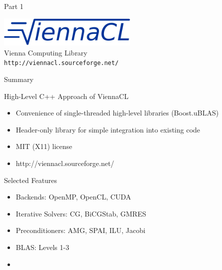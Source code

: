 



\begin{frame}{Part 1}
 \begin{center}
   \large \includegraphics[width=0.5\textwidth]{figures/viennacl-logo} \\[1em] Vienna Computing Library \\[2em] \normalfont \texttt{http://viennacl.sourceforge.net/}
 \end{center}
\end{frame}

















\begin{frame}{Summary}
 
 \begin{block}{High-Level C++ Approach of ViennaCL}
  \begin{itemize}
   \item Convenience of single-threaded high-level libraries (Boost.uBLAS)
   \item Header-only library for simple integration into existing code
   \item MIT (X11) license
   \item \centering http://viennacl.sourceforge.net/
  \end{itemize}
 \end{block}

 \begin{block}{Selected Features}
  \begin{itemize}
   \item Backends: OpenMP, OpenCL, CUDA
   \item Iterative Solvers: CG, BiCGStab, GMRES
   \item Preconditioners: AMG, SPAI, ILU, Jacobi
   \item BLAS: Levels 1-3
   \item 
  \end{itemize}
 \end{block}

\end{frame}
